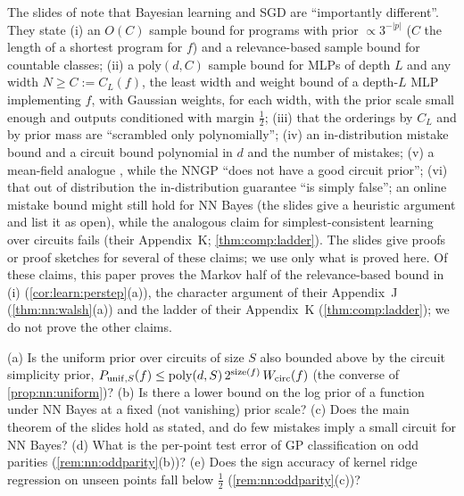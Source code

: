 \begin{remark}\label{rem:nn:slides}
The slides of \citet{vaintrobhanni2026nnbayes} note that Bayesian learning and SGD are ``importantly different''. They state (i) an $O(C)$ sample bound for programs with prior $\propto3^{-|p|}$ ($C$ the length of a shortest program for $f$) and a relevance-based sample bound for countable classes; (ii) a $\mathrm{poly}(d,C)$ sample bound for MLPs of depth $L$ and any width $N\ge C:=C_L(f)$, the least width and weight bound of a depth-$L$ MLP implementing $f$, with Gaussian weights, for each width, with the prior scale small enough and outputs conditioned with margin $\frac12$; (iii) that the orderings by $C_L$ and by prior mass are ``scrambled only polynomially''; (iv) an in-distribution mistake bound and a circuit bound polynomial in $d$ and the number of mistakes; (v) a mean-field analogue \citep{vaintrob2026width}, while the NNGP ``does not have a good circuit prior''; (vi) that out of distribution the in-distribution guarantee ``is simply false''; an online mistake bound might still hold for NN Bayes (the slides give a heuristic argument and list it as open), while the analogous claim for simplest-consistent learning over circuits fails (their Appendix~K; \cref{thm:comp:ladder}). The slides give proofs or proof sketches for several of these claims; we use only what is proved here. Of these claims, this paper proves the Markov half of the relevance-based bound in (i) (\cref{cor:learn:perstep}(a)), the character argument of their Appendix~J (\cref{thm:nn:walsh}(a)) and the ladder of their Appendix~K (\cref{thm:comp:ladder}); we do not prove the other claims.
\end{remark}

\begin{question}\label{q:nn:bridges}
(a) Is the uniform prior over circuits of size $S$ also bounded above by the circuit simplicity prior, $P_{{\rm unif},S}(f)\le\mathrm{poly}(d,S)\,2^{\operatorname{size}(f)}\,W_{\mathrm{circ}}(f)$ (the converse of \cref{prop:nn:uniform})? (b) Is there a lower bound on the log prior of a function under NN Bayes at a fixed (not vanishing) prior scale? (c) Does the main theorem of the slides hold as stated, and do few mistakes imply a small circuit for NN Bayes? (d) What is the per-point test error of GP classification on odd parities (\cref{rem:nn:oddparity}(b))? (e) Does the sign accuracy of kernel ridge regression on unseen points fall below $\frac12$ (\cref{rem:nn:oddparity}(c))?
\end{question}
